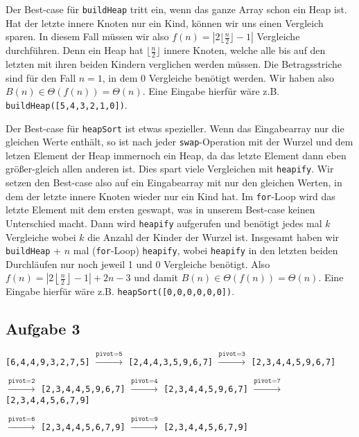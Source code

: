\documentclass[a4paper,graphics,11pt]{article}
\newcommand{\aufgabe}[1]{\subsection*{Aufgabe #1}}
\begin{document}
Der Best-case für \texttt{buildHeap} tritt ein, wenn das ganze Array schon ein Heap ist.
Hat der letzte innere Knoten nur ein Kind, können wir uns einen Vergleich sparen. In diesem Fall müssen wir also
$f(n) = |2\lfloor \frac{n}{2} \rfloor-1|$ Vergleiche durchführen. Denn ein Heap hat $\lfloor \frac{n}{2} \rfloor$ innere
Knoten, welche alle bis auf den letzten mit ihren beiden Kindern verglichen werden müssen.
Die Betragsstriche sind für den Fall $n=1$, in dem 0 Vergleiche benötigt werden.
Wir haben also $B(n) \in \Theta(f(n)) = \Theta(n)$.
Eine Eingabe hierfür wäre z.B. \texttt{buildHeap([5,4,3,2,1,0])}.

Der Best-case für \texttt{heapSort} ist etwas spezieller. Wenn das Eingabearray nur die gleichen Werte enthält, so
ist nach jeder \texttt{swap}-Operation mit der Wurzel und dem letzen Element der Heap immernoch ein Heap, da das letzte
Element dann eben größer-gleich allen anderen ist.
Dies spart viele Vergleichen mit \texttt{heapify}.
Wir setzen den Best-case also auf ein Eingabearray mit nur den gleichen Werten,
in dem der letzte innere Knoten wieder nur ein Kind hat.
Im \texttt{for}-Loop wird das letzte Element mit dem ersten geswapt, was in unserem Best-case keinen Unterschied macht.
Dann wird \texttt{heapify} aufgerufen und benötigt jedes mal $k$ Vergleiche wobei $k$ die Anzahl der Kinder der Wurzel ist.
Insgesamt haben wir \texttt{buildHeap} + $n$ mal (\texttt{for}-Loop) \texttt{heapify},
wobei \texttt{heapify} in den letzten beiden Durchläufen nur noch jeweil 1 und 0 Vergleiche
benötigt. Also $ f(n) = \left|2\left\lfloor \frac{n}{2} \right\rfloor -1\right| + 2n - 3$
und damit $B(n) \in \Theta(f(n)) = \Theta(n)$.
Eine Eingabe hierfür wäre z.B. \texttt{heapSort([0,0,0,0,0,0])}.



\aufgabe{3}
\texttt{[6,4,4,9,3,2,7,5]} $\xrightarrow{\texttt{pivot=5}}$
\texttt{[2,4,4,3,5,9,6,7]} $\xrightarrow{\texttt{pivot=3}}$
\texttt{[2,3,4,4,5,9,6,7]}

$\xrightarrow{\texttt{pivot=2}}$ \texttt{[2,3,4,4,5,9,6,7]}
$\xrightarrow{\texttt{pivot=4}}$ \texttt{[2,3,4,4,5,9,6,7]}
$\xrightarrow{\texttt{pivot=7}}$ \texttt{[2,3,4,4,5,6,7,9]}

$\xrightarrow{\texttt{pivot=6}}$ \texttt{[2,3,4,4,5,6,7,9]}
$\xrightarrow{\texttt{pivot=9}}$ \texttt{[2,3,4,4,5,6,7,9]}
\end{document}
